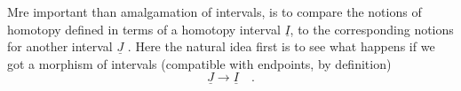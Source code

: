 Mre important than amalgamation of intervals, is to compare the
notions of homotopy defined in terms of a homotopy interval $\underline{I}$, to
the corresponding notions for another interval\hand{,} $\underline{J}$ . Here the natural idea
first is to see what happens if we got a morphism of intervals (compatible
with endpoints, by definition)
\[ \underline{J} \to \underline{I} \quad . \]

